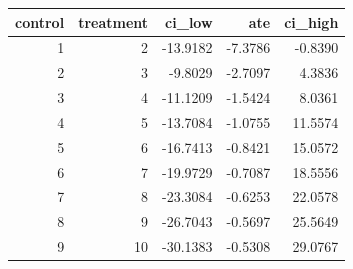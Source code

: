 \begin{tabular}{rrrrr}
\toprule
 control &  treatment &   ci_low &     ate &  ci_high \\
\midrule
       1 &          2 & -13.9182 & -7.3786 &  -0.8390 \\
       2 &          3 &  -9.8029 & -2.7097 &   4.3836 \\
       3 &          4 & -11.1209 & -1.5424 &   8.0361 \\
       4 &          5 & -13.7084 & -1.0755 &  11.5574 \\
       5 &          6 & -16.7413 & -0.8421 &  15.0572 \\
       6 &          7 & -19.9729 & -0.7087 &  18.5556 \\
       7 &          8 & -23.3084 & -0.6253 &  22.0578 \\
       8 &          9 & -26.7043 & -0.5697 &  25.5649 \\
       9 &         10 & -30.1383 & -0.5308 &  29.0767 \\
\bottomrule
\end{tabular}
